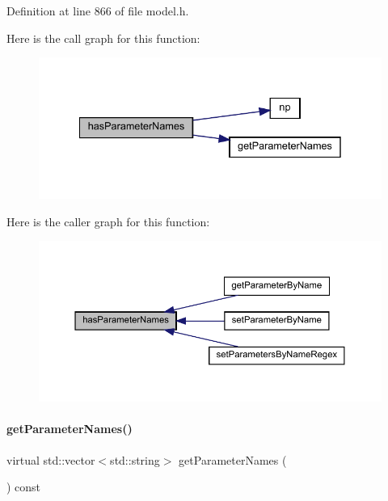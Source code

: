 Definition at line 866 of file model.\+h.

Here is the call graph for this function\+:
\nopagebreak
\begin{figure}[H]
\begin{center}
\leavevmode
\includegraphics[width=335pt]{classamici_1_1_model_a87eb819581d1ca627e5d5ab35ae8add9_cgraph}
\end{center}
\end{figure}
Here is the caller graph for this function\+:
\nopagebreak
\begin{figure}[H]
\begin{center}
\leavevmode
\includegraphics[width=350pt]{classamici_1_1_model_a87eb819581d1ca627e5d5ab35ae8add9_icgraph}
\end{center}
\end{figure}
\mbox{\label{classamici_1_1_model_a7bc0cf1cdd032486ba923fc1d9678262}} 
\paragraph{\texorpdfstring{get\+Parameter\+Names()}{getParameterNames()}}
{\footnotesize\ttfamily virtual std\+::vector$<$std\+::string$>$ get\+Parameter\+Names (\begin{DoxyParamCaption}{ }\end{DoxyParamCaption}) const\hspace{0.3cm}{\ttfamily [virtual]}}

